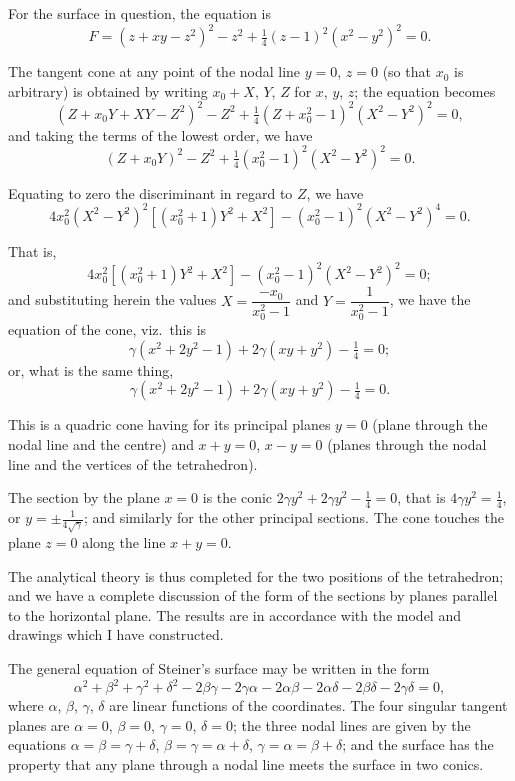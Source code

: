 \documentclass[11pt,a4paper]{book}
\begin{document}
For the surface in question, the equation is
\[
F = (z + xy - z^2)^2 - z^2 + \tfrac{1}{4}(z - 1)^2(x^2 - y^2)^2 = 0.
\]

The tangent cone at any point of the nodal line $y = 0$, $z = 0$ (so that $x_0$ is arbitrary) is obtained by writing $x_0 + X$, $Y$, $Z$ for $x$, $y$, $z$; the equation becomes
\[
(Z + x_0Y + XY - Z^2)^2 - Z^2 + \tfrac{1}{4}(Z + x_0^2 - 1)^2(X^2 - Y^2)^2 = 0,
\]
and taking the terms of the lowest order, we have
\[
(Z + x_0Y)^2 - Z^2 + \tfrac{1}{4}(x_0^2 - 1)^2(X^2 - Y^2)^2 = 0.
\]

Equating to zero the discriminant in regard to $Z$, we have
\[
4x_0^2(X^2 - Y^2)^2[(x_0^2 + 1)Y^2 + X^2] - (x_0^2 - 1)^2(X^2 - Y^2)^4 = 0.
\]

That is,
\[
4x_0^2[(x_0^2 + 1)Y^2 + X^2] - (x_0^2 - 1)^2(X^2 - Y^2)^2 = 0;
\]
and substituting herein the values $X = \dfrac{-x_0}{x_0^2 - 1}$ and $Y = \dfrac{1}{x_0^2 - 1}$, we have the equation of the cone, viz.\ this is
\[
\gamma(x^2 + 2y^2 - 1) + 2\gamma(xy + y^2) - \tfrac{1}{4} = 0;
\]
or, what is the same thing,
\[
\gamma(x^2 + 2y^2 - 1) + 2\gamma(xy + y^2) - \tfrac{1}{4} = 0.
\]

\newpage
\setcounter{page}{10}

This is a quadric cone having for its principal planes $y = 0$ (plane through the nodal line and the centre) and $x + y = 0$, $x - y = 0$ (planes through the nodal line and the vertices of the tetrahedron).

The section by the plane $x = 0$ is the conic $2\gamma y^2 + 2\gamma y^2 - \tfrac{1}{4} = 0$, that is $4\gamma y^2 = \tfrac{1}{4}$, or $y = \pm \tfrac{1}{4\sqrt{\gamma}}$; and similarly for the other principal sections. The cone touches the plane $z = 0$ along the line $x + y = 0$.

\newpage
\setcounter{page}{11}

The analytical theory is thus completed for the two positions of the tetrahedron; and we have a complete discussion of the form of the sections by planes parallel to the horizontal plane. The results are in accordance with the model and drawings which I have constructed.

\newpage
\setcounter{page}{12}

The general equation of Steiner's surface may be written in the form
\[
\alpha^2 + \beta^2 + \gamma^2 + \delta^2 - 2\beta\gamma - 2\gamma\alpha - 2\alpha\beta - 2\alpha\delta - 2\beta\delta - 2\gamma\delta = 0,
\]
where $\alpha$, $\beta$, $\gamma$, $\delta$ are linear functions of the coordinates. The four singular tangent planes are $\alpha = 0$, $\beta = 0$, $\gamma = 0$, $\delta = 0$; the three nodal lines are given by the equations $\alpha = \beta = \gamma + \delta$, $\beta = \gamma = \alpha + \delta$, $\gamma = \alpha = \beta + \delta$; and the surface has the property that any plane through a nodal line meets the surface in two conics.
\end{document}
